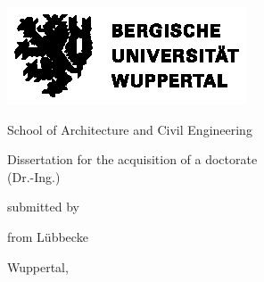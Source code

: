 \begin{titlingpage}
  \begin{center}
    \vspace*{\fill}
    \includegraphics[width=.75\textwidth]{logos/BUW_Logo-schwarz.eps}\bigskip
    \vspace*{\fill}\par
    {\Huge \thetitle\bigskip\par}
    \vspace*{\fill}\par
    {\Large School of Architecture and Civil Engineering\bigskip\par}
    {\Large Dissertation for the acquisition of a doctorate\\(Dr.-Ing.)\bigskip\par}
    {\Large submitted by\bigskip\par}
    {\LARGE \theauthor\par}
    {\Large from Lübbecke\bigskip\par}
    {\Large Wuppertal, \thedate\bigskip\bigskip\par}
  \end{center}
\end{titlingpage}
